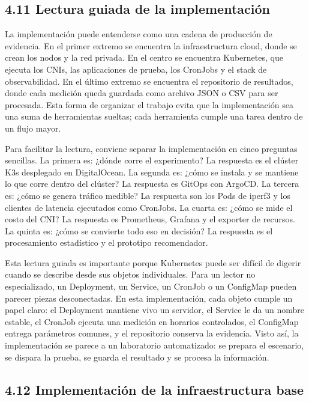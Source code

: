 \subsection{4.11 Lectura guiada de la implementación}

La implementación puede entenderse como una cadena de producción de evidencia. En el primer extremo se encuentra la infraestructura cloud, donde se crean los nodos y la red privada. En el centro se encuentra Kubernetes, que ejecuta los CNIs, las aplicaciones de prueba, los CronJobs y el stack de observabilidad. En el último extremo se encuentra el repositorio de resultados, donde cada medición queda guardada como archivo JSON o CSV para ser procesada. Esta forma de organizar el trabajo evita que la implementación sea una suma de herramientas sueltas; cada herramienta cumple una tarea dentro de un flujo mayor.

Para facilitar la lectura, conviene separar la implementación en cinco preguntas sencillas. La primera es: ¿dónde corre el experimento? La respuesta es el clúster K3s desplegado en DigitalOcean. La segunda es: ¿cómo se instala y se mantiene lo que corre dentro del clúster? La respuesta es GitOps con ArgoCD. La tercera es: ¿cómo se genera tráfico medible? La respuesta son los Pods de iperf3 y los clientes de latencia ejecutados como CronJobs. La cuarta es: ¿cómo se mide el costo del CNI? La respuesta es Prometheus, Grafana y el exporter de recursos. La quinta es: ¿cómo se convierte todo eso en decisión? La respuesta es el procesamiento estadístico y el prototipo recomendador.

Esta lectura guiada es importante porque Kubernetes puede ser difícil de digerir cuando se describe desde sus objetos individuales. Para un lector no especializado, un Deployment, un Service, un CronJob o un ConfigMap pueden parecer piezas desconectadas. En esta implementación, cada objeto cumple un papel claro: el Deployment mantiene vivo un servidor, el Service le da un nombre estable, el CronJob ejecuta una medición en horarios controlados, el ConfigMap entrega parámetros comunes, y el repositorio conserva la evidencia. Visto así, la implementación se parece a un laboratorio automatizado: se prepara el escenario, se dispara la prueba, se guarda el resultado y se procesa la información.

\subsection{4.12 Implementación de la infraestructura base}

